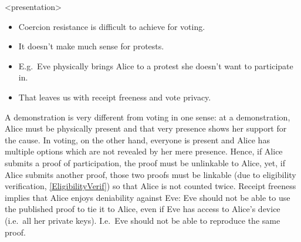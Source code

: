 \begin{frame}<presentation>
  \begin{remark}
    \begin{itemize}
      \item Coercion resistance is difficult to achieve for voting.
      \item It doesn't make much sense for protests.
      \item E.g.\ Eve physically brings Alice to a protest she doesn't want to 
        participate in.
      \item That leaves us with receipt freeness and vote privacy.
    \end{itemize}
  \end{remark}
\end{frame}

A demonstration is very different from voting in one sense: at a demonstration, 
Alice must be physically present and that very presence shows her support for 
the cause.
In voting, on the other hand, everyone is present and Alice has multiple 
options which are not revealed by her mere presence.
Hence, if Alice submits a proof of participation, the proof must be unlinkable 
to Alice, yet, if Alice submits another proof, those two proofs must be 
linkable (due to eligibility verification, \cref{EligibilityVerif}) so that 
Alice is not counted twice.
Receipt freeness implies that Alice enjoys deniability against Eve:
Eve should not be able to use the published proof to tie it to Alice, even if 
Eve has access to Alice's device (i.e.\ all her private keys).
I.e.\ Eve should not be able to reproduce the same proof.

